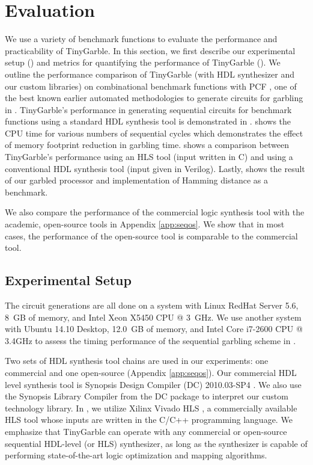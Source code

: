 \chapter{Evaluation}
We use a variety of benchmark functions to evaluate the performance and practicability of TinyGarble.
In this section, we first describe our experimental setup () and metrics for quantifying the performance of TinyGarble ().
We outline the performance comparison of TinyGarble (with HDL synthesizer and our custom libraries) on combinational benchmark functions with PCF \cite{kreuter2013pcf}, one of the best known earlier automated methodologies to generate circuits for garbling in .
TinyGarble's performance in generating sequential circuits for benchmark functions using a standard HDL synthesis tool is demonstrated in .
 shows the CPU time for various numbers of sequential cycles which demonstrates the effect of memory footprint reduction in garbling time.
 shows a comparison between TinyGarble's performance using an HLS tool (input written in C) and using a conventional HDL synthesis tool (input given in Verilog).
Lastly,  shows the result of our garbled processor and implementation of Hamming distance as a benchmark.

We also compare the performance of the commercial logic synthesis tool with the academic, open-source tools in Appendix \ref{app:seqos}.
We show that in most cases, the performance of the open-source tool is comparable to the commercial tool.

\section{Experimental Setup}
The circuit generations are all done on a system with Linux RedHat Server 5.6, 8~GB of memory, and Intel Xeon X5450 CPU @ 3~GHz.
We use another system with Ubuntu 14.10 Desktop, 12.0~GB of memory, and Intel Core i7-2600 CPU @ 3.4GHz to assess the timing performance of the sequential garbling scheme in .

Two sets of HDL synthesis tool chains are used in our experiments: one commercial and one open-source (Appendix \ref{app:seqos}).
Our commercial HDL level synthesis tool is Synopsis Design Compiler (DC) 2010.03-SP4 \cite{tool:DesignCompiler}.
We also use the Synopsis Library Compiler from the DC package to interpret our custom technology library.
In , we utilize Xilinx Vivado HLS \cite{tool:Vivado}, a commercially available HLS tool whose inputs are written in the C/C++ programming language.
We emphasize that TinyGarble can operate with any commercial or open-source sequential HDL-level (or HLS) synthesizer, as long as the synthesizer is capable of performing state-of-the-art logic optimization and mapping algorithms.

